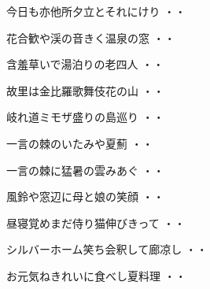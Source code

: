 \begin{shiika}今日も亦他所夕立とそれにけり
\hfill{・・}\end{shiika}
\vspace{0.6cm}
\begin{shiika}花合歓や渓の音きく温泉の窓
\hfill{・・}\end{shiika}
\vspace{0.6cm}
\begin{shiika}含羞草いで湯泊りの老四人
\hfill{・・}\end{shiika}
\vspace{0.6cm}
\begin{shiika}故里は金比羅歌舞伎花の山
\hfill{・・}\end{shiika}
\vspace{0.6cm}
\begin{shiika}岐れ道ミモザ盛りの島巡り
\hfill{・・}\end{shiika}
\vspace{0.6cm}
\begin{shiika}一言の棘のいたみや夏薊
\hfill{・・}\end{shiika}
\vspace{0.6cm}
\begin{shiika}一言の棘に猛暑の雲みあぐ
\hfill{・・}\end{shiika}
\vspace{0.6cm}
\begin{shiika}風鈴や窓辺に母と娘の笑顔
\hfill{・・}\end{shiika}
\vspace{0.6cm}
\begin{shiika}昼寝覚めまだ侍り猫伸びきって
\hfill{・・}\end{shiika}
\vspace{0.6cm}
\begin{shiika}シルバーホーム笑ち会釈して廊凉し
\hfill{・・}\end{shiika}
\vspace{0.6cm}
\begin{shiika}お元気ねきれいに食べし夏料理
\hfill{・・}\end{shiika}
\vspace{0.6cm}
